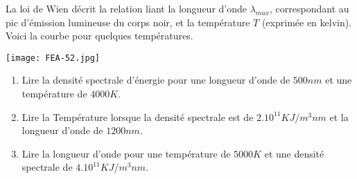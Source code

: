 
La loi de Wien décrit la relation liant la longueur d'onde  $\lambda_{max}$, correspondant au pic d'émission lumineuse du corps noir, et la température $T$ (exprimée en kelvin). Voici la courbe pour quelques températures.

\begin{center}
\texttt{[image: FEA-52.jpg]} 
\end{center}

\begin{enumerate}
\item Lire la densité spectrale d'énergie pour une longueur d'onde de $500 nm$ et une température de $4000K$.
\item Lire la Température lorsque la densité spectrale est de $2.10^{11} KJ/m^3 nm$ et la longueur d'onde de $1200 nm$.
\item Lire la longueur d'onde pour une température de $5000K$ et une densité spectrale de $4.10^{11} KJ/m^3 nm$.
\end{enumerate}

